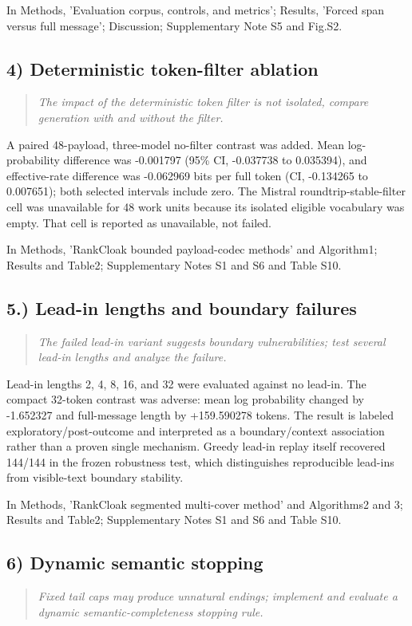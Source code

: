 \documentclass[11pt]{article}
\newenvironment{reviewcomment}{\begin{quote}\color{commentgray}\itshape}{\end{quote}}
\begin{document}
In Methods, 'Evaluation corpus, controls, and metrics'; Results, 'Forced span versus full message'; Discussion; Supplementary Note S5 and Fig.S2.

\subsection*{4) Deterministic token-filter ablation}
\begin{reviewcomment}
The impact of the deterministic token filter is not isolated, compare generation with and without the filter.
\end{reviewcomment}

A paired 48-payload, three-model no-filter contrast was added. Mean log-probability difference was -0.001797 (95\% CI, -0.037738 to 0.035394), and effective-rate difference was -0.062969 bits per full token (CI, -0.134265 to 0.007651); both selected intervals include zero. The Mistral roundtrip-stable-filter cell was unavailable for 48 work units because its isolated eligible vocabulary was empty. That cell is reported as unavailable, not failed.

In Methods, 'RankCloak bounded payload-codec methods' and Algorithm1; Results and Table2; Supplementary Notes S1 and S6 and Table S10.

\subsection*{5.) Lead-in lengths and boundary failures}
\begin{reviewcomment}
The failed lead-in variant suggests boundary vulnerabilities; test several lead-in lengths and analyze the failure.
\end{reviewcomment}

Lead-in lengths 2, 4, 8, 16, and 32 were evaluated against no lead-in. The compact 32-token contrast was adverse: mean log probability changed by -1.652327 and full-message length by +159.590278 tokens. The result is labeled exploratory/post-outcome and interpreted as a boundary/context association rather than a proven single mechanism. Greedy lead-in replay itself recovered 144/144 in the frozen robustness test, which distinguishes reproducible lead-ins from visible-text boundary stability.

In Methods, 'RankCloak segmented multi-cover method' and Algorithms2 and 3; Results and Table2; Supplementary Notes S1 and S6 and Table S10.

\subsection*{6) Dynamic semantic stopping}
\begin{reviewcomment}
Fixed tail caps may produce unnatural endings; implement and evaluate a dynamic semantic-completeness stopping rule.
\end{reviewcomment}
\end{document}

